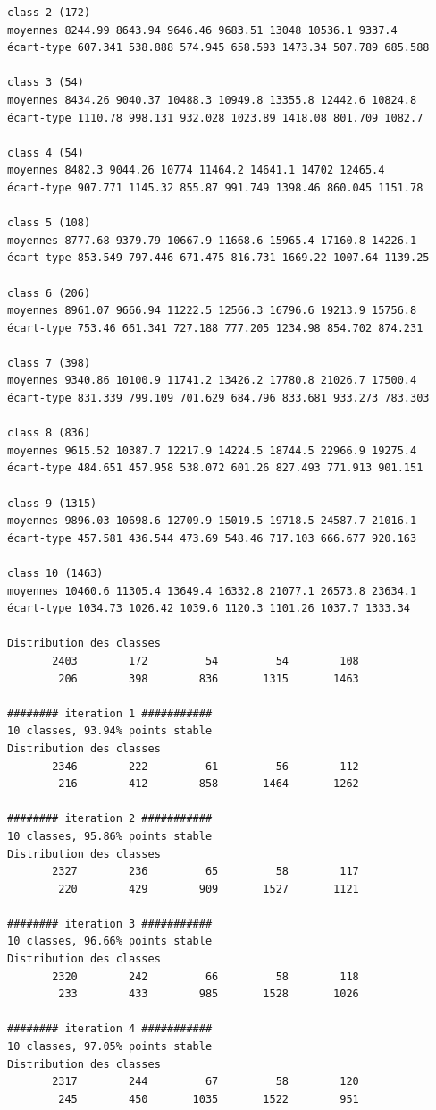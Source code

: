 \documentclass[land,article,submit,pdftex,moreauthors]{Definitions/mdpi}
\begin{document}
\begin{scriptsize}
\begin{verbatim}
class 2 (172)
moyennes 8244.99 8643.94 9646.46 9683.51 13048 10536.1 9337.4
écart-type 607.341 538.888 574.945 658.593 1473.34 507.789 685.588

class 3 (54)
moyennes 8434.26 9040.37 10488.3 10949.8 13355.8 12442.6 10824.8
écart-type 1110.78 998.131 932.028 1023.89 1418.08 801.709 1082.7

class 4 (54)
moyennes 8482.3 9044.26 10774 11464.2 14641.1 14702 12465.4
écart-type 907.771 1145.32 855.87 991.749 1398.46 860.045 1151.78

class 5 (108)
moyennes 8777.68 9379.79 10667.9 11668.6 15965.4 17160.8 14226.1
écart-type 853.549 797.446 671.475 816.731 1669.22 1007.64 1139.25

class 6 (206)
moyennes 8961.07 9666.94 11222.5 12566.3 16796.6 19213.9 15756.8
écart-type 753.46 661.341 727.188 777.205 1234.98 854.702 874.231

class 7 (398)
moyennes 9340.86 10100.9 11741.2 13426.2 17780.8 21026.7 17500.4
écart-type 831.339 799.109 701.629 684.796 833.681 933.273 783.303

class 8 (836)
moyennes 9615.52 10387.7 12217.9 14224.5 18744.5 22966.9 19275.4
écart-type 484.651 457.958 538.072 601.26 827.493 771.913 901.151

class 9 (1315)
moyennes 9896.03 10698.6 12709.9 15019.5 19718.5 24587.7 21016.1
écart-type 457.581 436.544 473.69 548.46 717.103 666.677 920.163

class 10 (1463)
moyennes 10460.6 11305.4 13649.4 16332.8 21077.1 26573.8 23634.1
écart-type 1034.73 1026.42 1039.6 1120.3 1101.26 1037.7 1333.34

Distribution des classes
       2403        172         54         54        108
        206        398        836       1315       1463

######## iteration 1 ###########
10 classes, 93.94% points stable
Distribution des classes
       2346        222         61         56        112
        216        412        858       1464       1262

######## iteration 2 ###########
10 classes, 95.86% points stable
Distribution des classes
       2327        236         65         58        117
        220        429        909       1527       1121

######## iteration 3 ###########
10 classes, 96.66% points stable
Distribution des classes
       2320        242         66         58        118
        233        433        985       1528       1026

######## iteration 4 ###########
10 classes, 97.05% points stable
Distribution des classes
       2317        244         67         58        120
        245        450       1035       1522        951


\end{verbatim}
\end{scriptsize}
\end{document}
